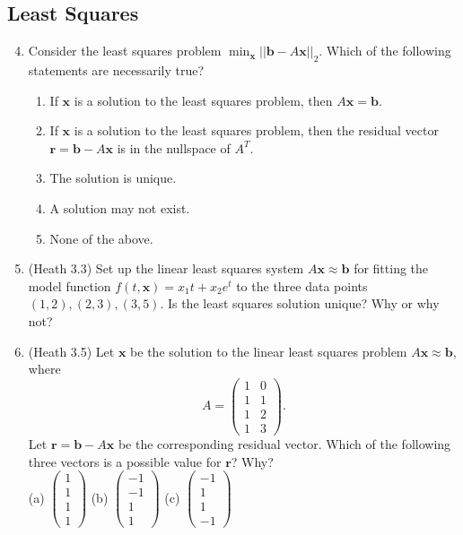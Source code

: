 \documentclass{article}
\renewcommand{\vec}[1]{\mathbf{#1}}
\newcommand{\x}{\vec{x}}
\renewcommand{\r}{\vec{r}}
\renewcommand{\b}{\vec{b}}
\begin{document}
\subsection*{Least Squares}
\begin{enumerate}
\setcounter{enumi}{3}

\item Consider the least squares problem $\min_\x ||\b - A\x||_2$.  Which of the following statements are
  necessarily true?
\begin{enumerate}
\item If $\x$ is a solution to the least squares problem, then $A\x = \b$.
\item If $\x$ is a solution to the least squares problem, then the residual vector $\r = \b - A \x$ is in the nullspace of $A^T$.
\item The solution is unique.
\item A solution may not exist.
\item None of the above.
\end{enumerate}

\item (Heath 3.3) Set up the linear least squares system $A\vec{x} \approx \vec{b}$ for fitting the model function $f(t,\vec{x}) = x_1 t + x_2 e^t$ to the three data points $(1,2),
  (2,3), (3,5)$.  Is the least squares solution unique? Why or why not?

\item (Heath 3.5) Let $\vec{x}$ be the solution to the linear least squares problem $A\vec{x} \approx \vec{b}$, where
$$
A = \begin{pmatrix}
1 & 0 \\ 1 & 1 \\ 1 & 2 \\ 1 & 3
\end{pmatrix}.
$$
Let $\vec{r} = \vec{b} - A\vec{x}$ be the corresponding residual vector.  Which of the following three vectors is a possible value for $\vec{r}$?  Why?\\
(a) $\begin{pmatrix} 1 \\ 1 \\ 1 \\ 1 \end{pmatrix}$ \quad (b) $\begin{pmatrix} -1 \\ -1 \\ 1 \\ 1 \end{pmatrix}$ \quad (c) $\begin{pmatrix} -1 \\ 1 \\ 1 \\ -1 \end{pmatrix}$

\end{enumerate}
\end{document}
